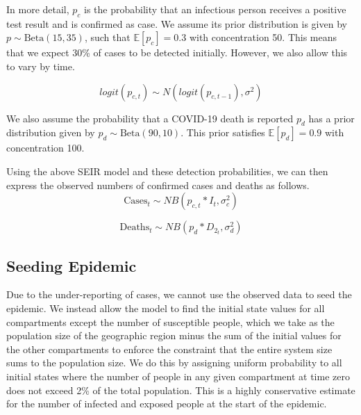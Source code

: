 \documentclass[11pt]{amsart}
\newcommand{\Beta}{\text{Beta}}
\newcommand{\E}{\mathbb{E}}
\begin{document}
In more detail, $p_c$ is the probability that an infectious person receives a positive test result and is confirmed as case. We assume its prior distribution is given by  $p \sim \Beta(15, 35)$, such that  $\E[p_c] = 0.3$ with concentration 50. This means that we expect 30\% of cases to be detected initially. However, we also allow this to vary by time.

\begin{equation}
logit(p_{c,t}) \sim N(logit(p_{c,t-1}), \sigma^2)
\end{equation}

We also assume the probability that a COVID-19 death is reported $p_d$ has a prior distribution given by  $p_d \sim \Beta(90, 10)$. This prior satisfies $\E[p_d] = 0.9$ with concentration 100.

 


Using the above SEIR model and these detection probabilities, we can then express the observed numbers of confirmed cases and deaths as follows.
\begin{equation}
\text{Cases}_{t} \sim NB(p_{c,t}*I_{t},\sigma_{c}^2)
\end{equation}

\begin{equation}
\text{Deaths}_{t} \sim NB(p_d*D_{2_{t}}, \sigma_d^2)
\end{equation}


%

\subsection{Seeding Epidemic}
Due to the under-reporting of cases, we cannot use the observed data to seed the epidemic. We instead allow the model to find the initial state values for all compartments except the number of susceptible people, which we take as the population size of the geographic region minus the sum of the initial values for the other compartments to enforce the constraint that the entire system size sums to the population size. We do this by assigning uniform probability to all initial states where the number of people in any given compartment at time zero does not exceed 2\% of the total population. This is a highly conservative estimate for the number of infected and exposed people at the start of the epidemic. 
\end{document}
